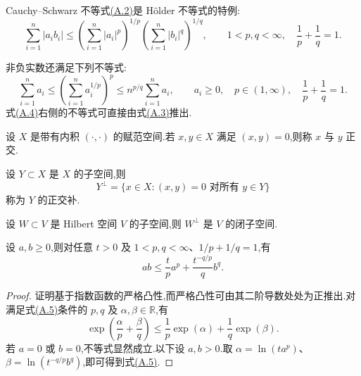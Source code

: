 \begin{example}\label{ex:appendix-a-15}
Cauchy--Schwarz 不等式\hyperref[eq:appendix-a-2]{(A.2)}是 Hölder 不等式的特例:
\begin{equation}\label{eq:appendix-a-3}
 \sum_{i=1}^n|a_i b_i|
 \le\left(\sum_{i=1}^n|a_i|^p\right)^{1/p}
     \left(\sum_{i=1}^n|b_i|^q\right)^{1/q},
 \qquad 1<p,q<\infty,\quad \frac1p+\frac1q=1.
\end{equation}

非负实数还满足下列不等式:
\begin{equation}\label{eq:appendix-a-4}
 \sum_{i=1}^n a_i
 \le\left(\sum_{i=1}^n a_i^{1/p}\right)^p
 \le n^{p/q}\sum_{i=1}^n a_i,
 \qquad a_i\ge0,\quad p\in(1,\infty),\quad \frac1p+\frac1q=1.
\end{equation}
式\hyperref[eq:appendix-a-4]{(A.4)}右侧的不等式可直接由式\hyperref[eq:appendix-a-3]{(A.3)}推出.
\end{example}

\begin{definition}[正交元素与子空间的正交补]\label{def:appendix-a-16}
设 $X$ 是带有内积 $(\cdot,\cdot)$ 的赋范空间.若 $x,y\in X$ 满足 $(x,y)=0$,则称 $x$ 与 $y$ 正交.

设 $Y\subset X$ 是 $X$ 的子空间,则
\[
 Y^\perp=\{x\in X:(x,y)=0\text{ 对所有 }y\in Y\}
\]
称为 $Y$ 的正交补.
\end{definition}

\begin{lemma}[正交补是闭子空间]\label{lem:appendix-a-17}
设 $W\subset V$ 是 Hilbert 空间 $V$ 的子空间,则 $W^\perp$ 是 $V$ 的闭子空间.
\end{lemma}

\begin{lemma}\label{lem:appendix-a-18}
设 $a,b\ge0$,则对任意 $t>0$ 及 $1<p,q<\infty$、$1/p+1/q=1$,有
\begin{equation}\label{eq:appendix-a-5}
 ab\le\frac{t}{p}a^p+\frac{t^{-q/p}}{q}b^q.
\end{equation}
\end{lemma}
\begin{proof}
证明基于指数函数的严格凸性,而严格凸性可由其二阶导数处处为正推出.对满足式\hyperref[eq:appendix-a-5]{(A.5)}条件的 $p,q$ 及 $\alpha,\beta\in\mathbb R$,有
\[
 \exp\left(\frac{\alpha}{p}+\frac{\beta}{q}\right)
 \le\frac1p\exp(\alpha)+\frac1q\exp(\beta).
\]
若 $a=0$ 或 $b=0$,不等式显然成立.以下设 $a,b>0$.取 $\alpha=\ln(ta^p)$、$\beta=\ln(t^{-q/p}b^q)$,即可得到式\hyperref[eq:appendix-a-5]{(A.5)}.
\end{proof}

